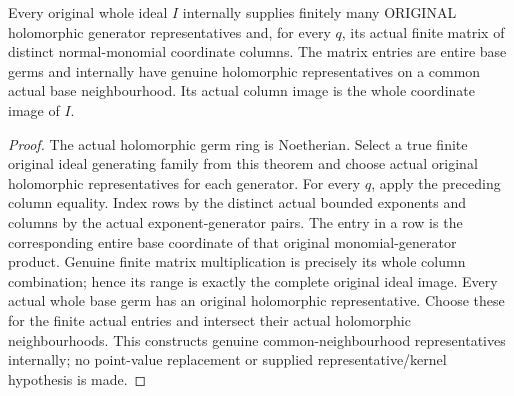 \begin{theorem}
\label{hir:relative-normal-ideal-actual-original-matrices}
\leanok
Every original whole ideal $I$ internally supplies finitely many ORIGINAL
holomorphic generator representatives and, for every $q$, its actual finite
matrix of distinct normal-monomial coordinate columns. The matrix entries
are entire base germs and internally have genuine holomorphic representatives
on a common actual base neighbourhood. Its actual column image is the whole
coordinate image of $I$.
\end{theorem}
\begin{proof}
The actual holomorphic germ ring is Noetherian. Select a true finite original
ideal generating family from this theorem and choose actual original
holomorphic representatives for each generator. For every $q$, apply the
preceding column equality. Index rows by the distinct actual bounded
exponents and columns by the actual exponent-generator pairs. The entry
in a row is the corresponding entire base coordinate of that original
monomial-generator product. Genuine finite matrix multiplication is precisely
its whole column combination; hence its range is exactly the complete
original ideal image. Every actual whole base germ has an original
holomorphic representative. Choose these for the finite actual entries and
intersect their actual holomorphic neighbourhoods. This constructs genuine
common-neighbourhood representatives internally; no point-value replacement
or supplied representative/kernel hypothesis is made.
\end{proof}

